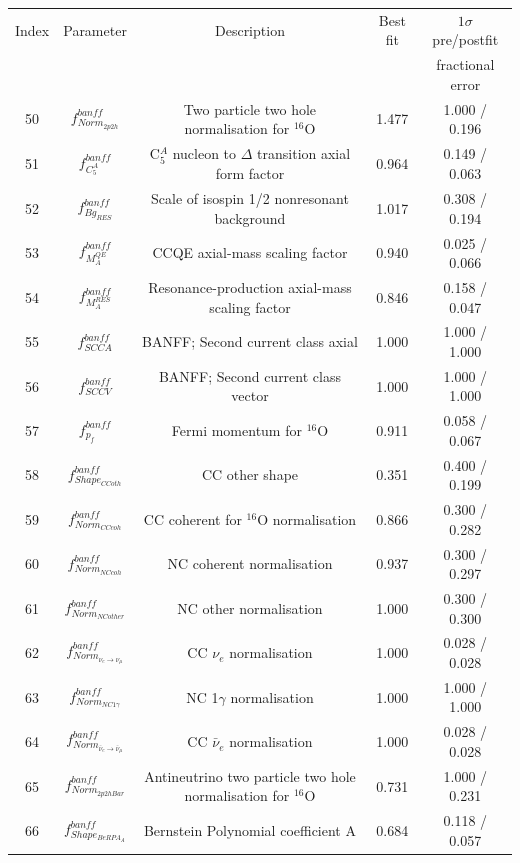 \begin{tabular} { | c | c | c | c | c |  }
\hline 
Index & Parameter & Description & Best fit & $1\sigma$ pre/postfit\\ 
 & &  &  & fractional error\\
\hline 
50 & $f_{Norm_{2p2h}}^{banff}$ & Two particle two hole normalisation for $^{16}$O & 1.477 & 1.000 / 0.196\\ 
51 & $f_{C^{A}_{5}}^{banff}$ & C$^{A}_{5}$ nucleon to $\Delta$ transition axial form factor & 0.964 & 0.149 / 0.063\\ 
52 & $f_{Bg_{RES}}^{banff}$ & Scale of isospin 1/2 nonresonant background & 1.017 & 0.308 / 0.194\\ 
53 & $f_{M_A^{QE}}^{banff}$ & CCQE axial-mass scaling factor & 0.940 & 0.025 / 0.066\\ 
54 & $f_{M_A^{RES}}^{banff}$ & Resonance-production axial-mass scaling factor & 0.846 & 0.158 / 0.047\\ 
55 & $f_{SCCA}^{banff}$ & BANFF; Second current class axial & 1.000 & 1.000 / 1.000\\ 
56 & $f_{SCCV}^{banff}$ & BANFF; Second current class vector & 1.000 & 1.000 / 1.000\\ 
57 & $f_{p_{f}}^{banff}$ & Fermi momentum for $^{16}$O & 0.911 & 0.058 / 0.067\\ 
58 & $f_{Shape_{CCoth}}^{banff}$ & CC other shape & 0.351 & 0.400 / 0.199\\ 
59 & $f_{Norm_{CCcoh}}^{banff}$ & CC coherent for $^{16}$O normalisation & 0.866 & 0.300 / 0.282\\ 
60 & $f_{Norm_{NCcoh}}^{banff}$ & NC coherent normalisation & 0.937 & 0.300 / 0.297\\ 
61 & $f_{Norm_{NCother}}^{banff}$ & NC other normalisation & 1.000 & 0.300 / 0.300\\ 
62 & $f_{Norm_{\nu_e \rightarrow \nu_\mu}}^{banff}$ & CC $\nu_{e}$ normalisation & 1.000 & 0.028 / 0.028\\ 
63 & $f_{Norm_{NC1\gamma}}^{banff}$ & NC 1$\gamma$ normalisation & 1.000 & 1.000 / 1.000\\ 
64 & $f_{Norm_{\bar{\nu}_e \rightarrow \bar{\nu}_{\mu}}}^{banff}$ & CC $\bar{\nu}_{e}$ normalisation & 1.000 & 0.028 / 0.028\\ 
65 & $f_{Norm_{2p2hBar}}^{banff}$ & Antineutrino two particle two hole normalisation for $^{16}$O & 0.731 & 1.000 / 0.231\\ 
66 & $f_{Shape_{BeRPA_{A}}}^{banff}$ & Bernstein Polynomial coefficient A & 0.684 & 0.118 / 0.057\\ 

\end{tabular}
